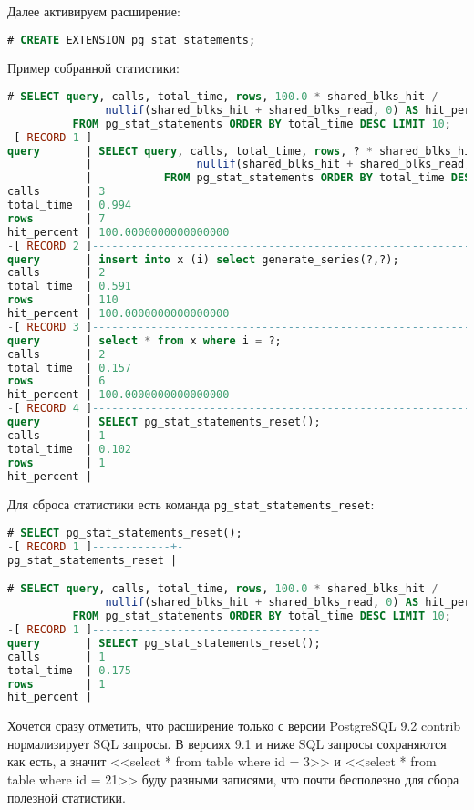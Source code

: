 Далее активируем расширение:

\begin{lstlisting}[language=SQL,label=lst:sql_performance13,caption=Активация pg\_stat\_statements]
# CREATE EXTENSION pg_stat_statements;
\end{lstlisting}

Пример собранной статистики:

\begin{lstlisting}[language=SQL,label=lst:sql_performance14,caption=pg\_stat\_statements статистика]
# SELECT query, calls, total_time, rows, 100.0 * shared_blks_hit /
               nullif(shared_blks_hit + shared_blks_read, 0) AS hit_percent
          FROM pg_stat_statements ORDER BY total_time DESC LIMIT 10;
-[ RECORD 1 ]----------------------------------------------------------------------------
query       | SELECT query, calls, total_time, rows, ? * shared_blks_hit /
            |                nullif(shared_blks_hit + shared_blks_read, ?) AS hit_percent
            |           FROM pg_stat_statements ORDER BY total_time DESC LIMIT ?;
calls       | 3
total_time  | 0.994
rows        | 7
hit_percent | 100.0000000000000000
-[ RECORD 2 ]----------------------------------------------------------------------------
query       | insert into x (i) select generate_series(?,?);
calls       | 2
total_time  | 0.591
rows        | 110
hit_percent | 100.0000000000000000
-[ RECORD 3 ]----------------------------------------------------------------------------
query       | select * from x where i = ?;
calls       | 2
total_time  | 0.157
rows        | 6
hit_percent | 100.0000000000000000
-[ RECORD 4 ]----------------------------------------------------------------------------
query       | SELECT pg_stat_statements_reset();
calls       | 1
total_time  | 0.102
rows        | 1
hit_percent |
\end{lstlisting}

Для сброса статистики есть команда \lstinline!pg_stat_statements_reset!:

\begin{lstlisting}[language=SQL,label=lst:sql_performance15,caption=Сброс статистики]
# SELECT pg_stat_statements_reset();
-[ RECORD 1 ]------------+-
pg_stat_statements_reset |

# SELECT query, calls, total_time, rows, 100.0 * shared_blks_hit /
               nullif(shared_blks_hit + shared_blks_read, 0) AS hit_percent
          FROM pg_stat_statements ORDER BY total_time DESC LIMIT 10;
-[ RECORD 1 ]-----------------------------------
query       | SELECT pg_stat_statements_reset();
calls       | 1
total_time  | 0.175
rows        | 1
hit_percent |
\end{lstlisting}

Хочется сразу отметить, что расширение только с версии PostgreSQL 9.2 contrib нормализирует SQL запросы. В версиях 9.1 и ниже SQL запросы сохраняются как есть, а значит <<select * from table where id = 3>> и <<select * from table where id = 21>> буду разными записями, что почти бесполезно для сбора полезной статистики.